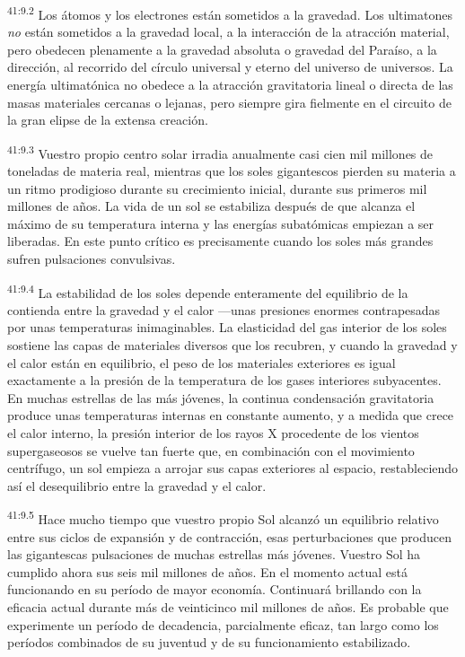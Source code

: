\par
\textsuperscript{41:9.2} Los átomos y los electrones están sometidos a la gravedad. Los ultimatones \textit{no} están sometidos a la gravedad local, a la interacción de la atracción material, pero obedecen plenamente a la gravedad absoluta o gravedad del Paraíso, a la dirección, al recorrido del círculo universal y eterno del universo de universos. La energía ultimatónica no obedece a la atracción gravitatoria lineal o directa de las masas materiales cercanas o lejanas, pero siempre gira fielmente en el circuito de la gran elipse de la extensa creación.

\par
\textsuperscript{41:9.3} Vuestro propio centro solar irradia anualmente casi cien mil millones de toneladas de materia real, mientras que los soles gigantescos pierden su materia a un ritmo prodigioso durante su crecimiento inicial, durante sus primeros mil millones de años. La vida de un sol se estabiliza después de que alcanza el máximo de su temperatura interna y las energías subatómicas empiezan a ser liberadas. En este punto crítico es precisamente cuando los soles más grandes sufren pulsaciones convulsivas.

\par
\textsuperscript{41:9.4} La estabilidad de los soles depende enteramente del equilibrio de la contienda entre la gravedad y el calor ---unas presiones enormes contrapesadas por unas temperaturas inimaginables. La elasticidad del gas interior de los soles sostiene las capas de materiales diversos que los recubren, y cuando la gravedad y el calor están en equilibrio, el peso de los materiales exteriores es igual exactamente a la presión de la temperatura de los gases interiores subyacentes. En muchas estrellas de las más jóvenes, la continua condensación gravitatoria produce unas temperaturas internas en constante aumento, y a medida que crece el calor interno, la presión interior de los rayos X procedente de los vientos supergaseosos se vuelve tan fuerte que, en combinación con el movimiento centrífugo, un sol empieza a arrojar sus capas exteriores al espacio, restableciendo así el desequilibrio entre la gravedad y el calor.

\par
\textsuperscript{41:9.5} Hace mucho tiempo que vuestro propio Sol alcanzó un equilibrio relativo entre sus ciclos de expansión y de contracción, esas perturbaciones que producen las gigantescas pulsaciones de muchas estrellas más jóvenes. Vuestro Sol ha cumplido ahora sus seis mil millones de años. En el momento actual está funcionando en su período de mayor economía. Continuará brillando con la eficacia actual durante más de veinticinco mil millones de años. Es probable que experimente un período de decadencia, parcialmente eficaz, tan largo como los períodos combinados de su juventud y de su funcionamiento estabilizado.

